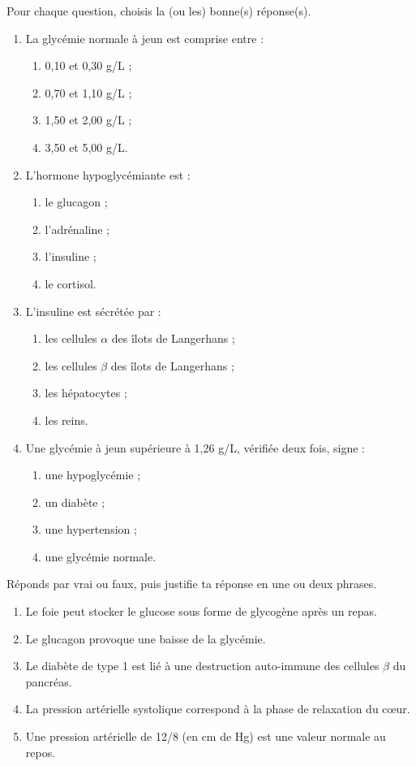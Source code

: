 \documentclass[11pt]{article}
\begin{document}
\begin{exercice}
Pour chaque question, choisis la (ou les) bonne(s) réponse(s).
\begin{enumerate}
\item La glycémie normale à jeun est comprise entre :
\begin{enumerate}
\item 0,10 et 0,30 g/L ; \item 0,70 et 1,10 g/L ; \item 1,50 et 2,00 g/L ; \item 3,50 et 5,00 g/L.
\end{enumerate}
\item L'hormone hypoglycémiante est :
\begin{enumerate}
\item le glucagon ; \item l'adrénaline ; \item l'insuline ; \item le cortisol.
\end{enumerate}
\item L'insuline est sécrétée par :
\begin{enumerate}
\item les cellules $\alpha$ des îlots de Langerhans ; \item les cellules $\beta$ des îlots de Langerhans ; \item les hépatocytes ; \item les reins.
\end{enumerate}
\item Une glycémie à jeun supérieure à 1,26 g/L, vérifiée deux fois, signe :
\begin{enumerate}
\item une hypoglycémie ; \item un diabète ; \item une hypertension ; \item une glycémie normale.
\end{enumerate}
\end{enumerate}
\end{exercice}

\begin{exercice}
Réponds par vrai ou faux, puis justifie ta réponse en une ou deux phrases.
\begin{enumerate}
\item Le foie peut stocker le glucose sous forme de glycogène après un repas.
\item Le glucagon provoque une baisse de la glycémie.
\item Le diabète de type 1 est lié à une destruction auto-immune des cellules $\beta$ du pancréas.
\item La pression artérielle systolique correspond à la phase de relaxation du cœur.
\item Une pression artérielle de 12/8 (en cm de Hg) est une valeur normale au repos.
\end{enumerate}
\end{exercice}
\end{document}
